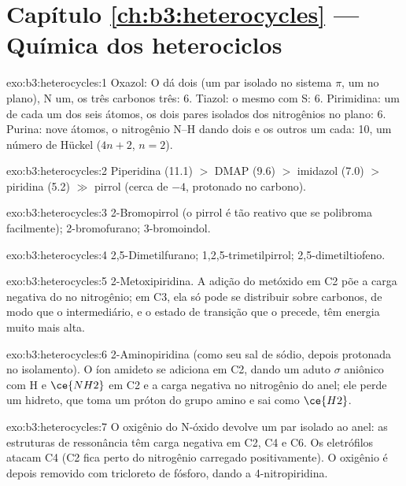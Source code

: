 \section*{Capítulo \ref{ch:b3:heterocycles} --- Química dos heterociclos}

\begin{solution}{exo:b3:heterocycles:1}
Oxazol: O dá dois (um par isolado no sistema $\pi$, um no plano), N um, os
três carbonos três: 6. Tiazol: o mesmo com S: 6. Pirimidina: um de cada
um dos seis átomos, os dois pares isolados dos nitrogênios no plano: 6. Purina: nove átomos,
o nitrogênio N--H dando dois e os outros um cada: 10, um número de Hückel
($4n + 2$, $n = 2$).
\end{solution}

\begin{solution}{exo:b3:heterocycles:2}
Piperidina (11.1) $>$ DMAP (9.6) $>$ imidazol (7.0) $>$ piridina (5.2) $\gg$ pirrol (cerca de $-4$,
protonado no carbono).
\end{solution}

\begin{solution}{exo:b3:heterocycles:3}
2-Bromopirrol (o pirrol é tão reativo que se polibroma facilmente);
2-bromofurano; 3-bromoindol.
\end{solution}

\begin{solution}{exo:b3:heterocycles:4}
2,5-Dimetilfurano; 1,2,5-trimetilpirrol; 2,5-dimetiltiofeno.
\end{solution}

\begin{solution}{exo:b3:heterocycles:5}
2-Metoxipiridina. A adição do metóxido em C2 põe a carga negativa do
 no nitrogênio; em C3, ela só pode se distribuir sobre carbonos, de modo que o
intermediário, e o estado de transição que o precede, têm energia muito mais alta.
\end{solution}

\begin{solution}{exo:b3:heterocycles:6}
2-Aminopiridina (como seu sal de sódio, depois protonada no isolamento). O íon amideto
se adiciona em C2, dando um aduto $\sigma$ aniônico com H e $\ce{NH2}$ em C2 e a carga
negativa no nitrogênio do anel; ele perde um hidreto, que toma um próton do
grupo amino e sai como $\ce{H2}$.
\end{solution}

\begin{solution}{exo:b3:heterocycles:7}
O oxigênio do N-óxido devolve um par isolado ao anel: as estruturas de ressonância
têm carga negativa em C2, C4 e C6. Os eletrófilos atacam C4 (C2
fica perto do nitrogênio carregado positivamente). O oxigênio é depois removido com
tricloreto de fósforo, dando a 4-nitropiridina.
\end{solution}

